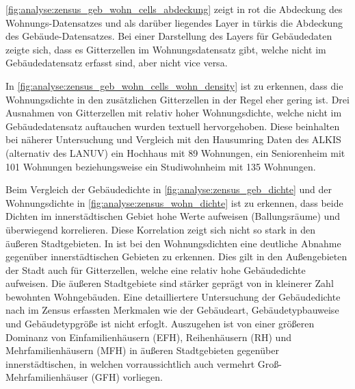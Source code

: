 			
			\autoref{fig:analyse:zensus_geb_wohn_cells_abdeckung} zeigt in rot die Abdeckung des Wohnungs-Datensatzes und als darüber liegendes Layer in türkis die Abdeckung des Gebäude-Datensatzes. Bei einer Darstellung des Layers für Gebäudedaten zeigte sich, dass es Gitterzellen im Wohnungsdatensatz gibt, welche nicht im Gebäudedatensatz erfasst sind, aber nicht vice versa. 
			
			In \autoref{fig:analyse:zensus_geb_wohn_cells_wohn_density} ist zu erkennen, dass die Wohnungsdichte in den zusätzlichen Gitterzellen in der Regel eher gering ist. Drei Ausnahmen von Gitterzellen mit relativ hoher Wohnungsdichte, welche nicht im Gebäudedatensatz auftauchen wurden textuell hervorgehoben. Diese beinhalten bei näherer Untersuchung und Vergleich mit den Hausumring Daten des ALKIS (alternativ des LANUV) ein Hochhaus mit 89 Wohnungen, ein Seniorenheim mit 101 Wohnungen beziehungsweise ein Studiwohnheim mit 135 Wohnungen. 
			
			Beim Vergleich der Gebäudedichte in \autoref{fig:analyse:zensus_geb_dichte} und der Wohnungsdichte in \autoref{fig:analyse:zensus_wohn_dichte} ist zu erkennen, dass beide Dichten im innerstädtischen Gebiet hohe Werte aufweisen (Ballungsräume) und überwiegend korrelieren. Diese Korrelation zeigt sich nicht so stark in den äußeren Stadtgebieten. In ist bei den Wohnungsdichten eine deutliche Abnahme gegenüber innerstädtischen Gebieten zu erkennen. Dies gilt in den Außengebieten der Stadt auch für Gitterzellen, welche eine relativ hohe Gebäudedichte aufweisen. Die äußeren Stadtgebiete sind stärker geprägt von in kleinerer Zahl bewohnten Wohngebäuden. Eine detailliertere Untersuchung der Gebäudedichte nach im Zensus erfassten Merkmalen wie der Gebäudeart, Gebäudetypbauweise und Gebäudetypgröße ist nicht erfoglt. Auszugehen ist von einer größeren Dominanz von Einfamilienhäusern (EFH), Reihenhäusern (RH) und Mehrfamilienhäusern (MFH) in äußeren Stadtgebieten gegenüber innerstädtischen, in welchen vorraussichtlich auch vermehrt Groß-Mehrfamilienhäuser (GFH) vorliegen. \\
			
			
